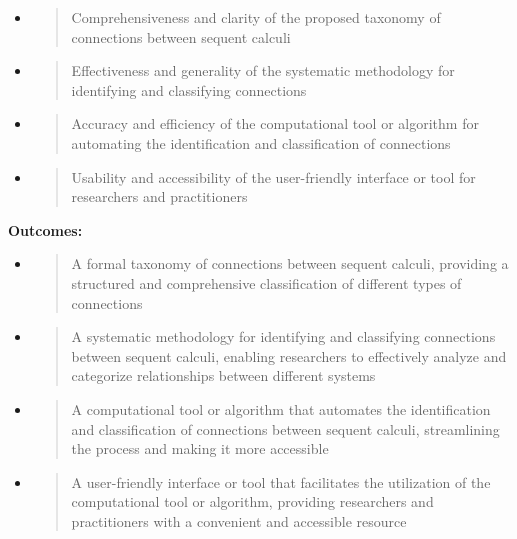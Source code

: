\begin{itemize}
\item
  \begin{quote}
  Comprehensiveness and clarity of the proposed taxonomy of connections
  between sequent calculi
  \end{quote}
\item
  \begin{quote}
  Effectiveness and generality of the systematic methodology for
  identifying and classifying connections
  \end{quote}
\item
  \begin{quote}
  Accuracy and efficiency of the computational tool or algorithm for
  automating the identification and classification of connections
  \end{quote}
\item
  \begin{quote}
  Usability and accessibility of the user-friendly interface or tool for
  researchers and practitioners
  \end{quote}
\end{itemize}

\textbf{Outcomes:}

\begin{itemize}
\item
  \begin{quote}
  A formal taxonomy of connections between sequent calculi, providing a
  structured and comprehensive classification of different types of
  connections
  \end{quote}
\item
  \begin{quote}
  A systematic methodology for identifying and classifying connections
  between sequent calculi, enabling researchers to effectively analyze
  and categorize relationships between different systems
  \end{quote}
\item
  \begin{quote}
  A computational tool or algorithm that automates the identification
  and classification of connections between sequent calculi,
  streamlining the process and making it more accessible
  \end{quote}
\item
  \begin{quote}
  A user-friendly interface or tool that facilitates the utilization of
  the computational tool or algorithm, providing researchers and
  practitioners with a convenient and accessible resource
  \end{quote}
\end{itemize}

